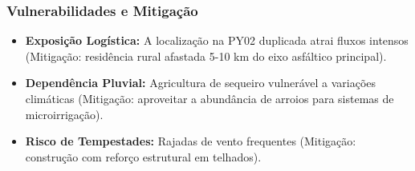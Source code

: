 \subsubsection{Vulnerabilidades e
Mitigação}

\begin{itemize}
\tightlist
\item
  \textbf{Exposição Logística:} A localização na PY02 duplicada atrai
  fluxos intensos (Mitigação: residência rural afastada 5-10 km do eixo
  asfáltico principal).
\item
  \textbf{Dependência Pluvial:} Agricultura de sequeiro vulnerável a
  variações climáticas (Mitigação: aproveitar a abundância de arroios
  para sistemas de microirrigação).
\item
  \textbf{Risco de Tempestades:} Rajadas de vento frequentes (Mitigação:
  construção com reforço estrutural em telhados).
\end{itemize}

